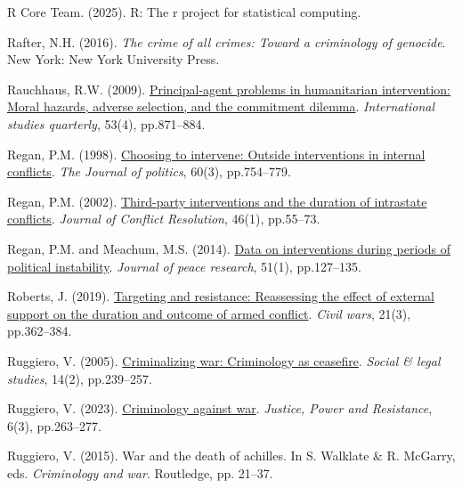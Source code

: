 \documentclass[
]{article}
\newlength{\cslhangindent}
\newenvironment{CSLReferences}[2] %
 {\begin{list}{}{%
  \setlength{\itemindent}{0pt}
  \setlength{\leftmargin}{0pt}
  \setlength{\parsep}{0pt}
  \ifodd #1
   \setlength{\leftmargin}{\cslhangindent}
   \setlength{\itemindent}{-1\cslhangindent}
  \fi
  \setlength{\itemsep}{#2\baselineskip}}}
 {\end{list}}
\begin{document}
\begin{CSLReferences}{0}{1}
R Core Team. (2025). R: The r project for statistical computing.

Rafter, N.H. (2016). \emph{The crime of all crimes: Toward a criminology
of genocide}. New York: New York University Press.

Rauchhaus, R.W. (2009).
\href{https://doi.org/10.1111/j.1468-2478.2009.00560.x}{Principal-agent
problems in humanitarian intervention: Moral hazards, adverse selection,
and the commitment dilemma}. \emph{International studies quarterly},
53(4), pp.871--884.

Regan, P.M. (1998). \href{https://doi.org/10.2307/2647647}{Choosing to
intervene: Outside interventions in internal conflicts}. \emph{The
Journal of politics}, 60(3), pp.754--779.

Regan, P.M. (2002).
\href{https://doi.org/10.1177/0022002702046001004}{Third-party
interventions and the duration of intrastate conflicts}. \emph{Journal
of Conflict Resolution}, 46(1), pp.55--73.

Regan, P.M. and Meachum, M.S. (2014).
\href{https://doi.org/10.1177/0022343313505303}{Data on interventions
during periods of political instability}. \emph{Journal of peace
research}, 51(1), pp.127--135.

Roberts, J. (2019).
\href{https://doi.org/10.1080/13698249.2019.1648631}{Targeting and
resistance: Reassessing the effect of external support on the duration
and outcome of armed conflict}. \emph{Civil wars}, 21(3), pp.362--384.

Ruggiero, V. (2005).
\href{https://doi.org/10.1177/0964663905051221}{Criminalizing war:
Criminology as ceasefire}. \emph{Social \& legal studies}, 14(2),
pp.239--257.

Ruggiero, V. (2023). \href{https://doi.org/10.1332/TGBW8348}{Criminology
against war}. \emph{Justice, Power and Resistance}, 6(3), pp.263--277.

Ruggiero, V. (2015). War and the death of achilles. In S. Walklate \& R.
McGarry, eds. \emph{Criminology and war}. Routledge, pp. 21--37.


\end{CSLReferences}
\end{document}
